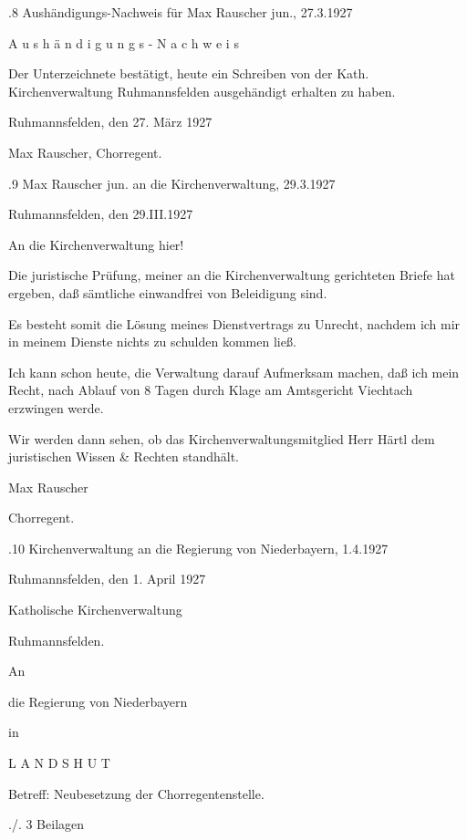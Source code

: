 \documentclass{book}
\begin{document}
.8 Aushändigungs-Nachweis für Max Rauscher jun., 27.3.1927

A u s h ä n d i g u n g s - N a c h w e i s



Der Unterzeichnete bestätigt, heute ein Schreiben von der Kath.
Kirchenverwaltung Ruhmannsfelden ausgehändigt erhalten zu haben.



Ruhmannsfelden, den 27. März 1927



Max Rauscher, Chorregent.

.9 Max Rauscher jun. an die Kirchenverwaltung, 29.3.1927

Ruhmannsfelden, den 29.III.1927



An die Kirchenverwaltung hier!



Die juristische Prüfung, meiner an die Kirchenverwaltung gerichteten Briefe hat
ergeben, daß sämtliche einwandfrei von Beleidigung sind.

Es besteht somit die Lösung meines Dienstvertrags zu Unrecht, nachdem ich mir in
meinem Dienste nichts zu schulden kommen ließ.

Ich kann schon heute, die Verwaltung darauf Aufmerksam machen, daß ich mein
Recht, nach Ablauf von 8 Tagen durch Klage am Amtsgericht Viechtach erzwingen
werde.

Wir werden dann sehen, ob das Kirchenverwaltungsmitglied Herr Härtl dem
juristischen Wissen & Rechten standhält.



Max Rauscher

Chorregent.

.10 Kirchenverwaltung an die Regierung von Niederbayern, 1.4.1927

Ruhmannsfelden, den 1. April 1927

Katholische Kirchenverwaltung

Ruhmannsfelden.



An

die Regierung von Niederbayern

in

    L A N D S H U T



    Betreff: Neubesetzung der Chorregentenstelle.



./. 3 Beilagen
\end{document}

